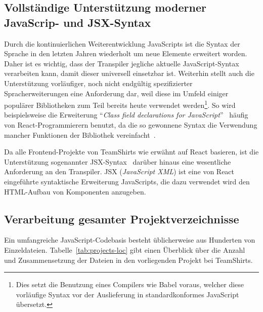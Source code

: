 \subsection{Vollständige Unterstützung moderner JavaScrip- und JSX-Syntax}
\label{subsec:requirement:modern-js-support}

Durch die kontinuierlichen Weiterentwicklung JavaScripts ist die Syntax der Sprache in den letzten Jahren wiederholt um neue Elemente erweitert worden. Daher ist es wichtig, dass der Transpiler jegliche aktuelle JavaScript-Syntax verarbeiten kann, damit dieser universell einsetzbar ist. Weiterhin stellt auch die Unterstützung vorläufiger, noch nicht endgültig spezifizierter Spracherweiterungen eine Anforderung dar, weil diese im Umfeld einiger populärer Bibliotheken zum Teil bereits heute verwendet werden\footnote{Dies setzt die Benutzung eines Compilers wie Babel voraus, welcher diese vorläufige Syntax vor der Auslieferung in standardkonformes JavaScript übersetzt.}. So wird beispielsweise die Erweiterung \enquote{\textit{Class field declarations for JavaScript}}~\autocite{ES_PROPOSAL:CLASS_FIELDS} häufig von React-Programmierern benutzt, da die so gewonnene Syntax die Verwendung mancher Funktionen der Bibliothek vereinfacht~\autocite{REACT:HANDLING_EVENTS}.

Da alle Frontend-Projekte von TeamShirts wie erwähnt auf React basieren, ist die Unterstützung sogenannter JSX-Syntax~\autocite{SOFTWARE:JSX} darüber hinaus eine wesentliche Anforderung an den Transpiler. JSX (\textit{JavaScript XML}) ist eine von React eingeführte syntaktische Erweiterung JavaScripts, die dazu verwendet wird den HTML-Aufbau von Komponenten anzugeben.

\subsection{Verarbeitung gesamter Projektverzeichnisse}
\label{subsec:requirement:batch-processing}


Ein umfangreiche JavaScript-Codebasis besteht üblicherweise aus Hunderten von Einzeldateien. Tabelle~\ref{tab:projects-loc} gibt einen Überblick über die Anzahl und Zusammensetzung der Dateien in den vorliegenden Projekt bei TeamShirts.



